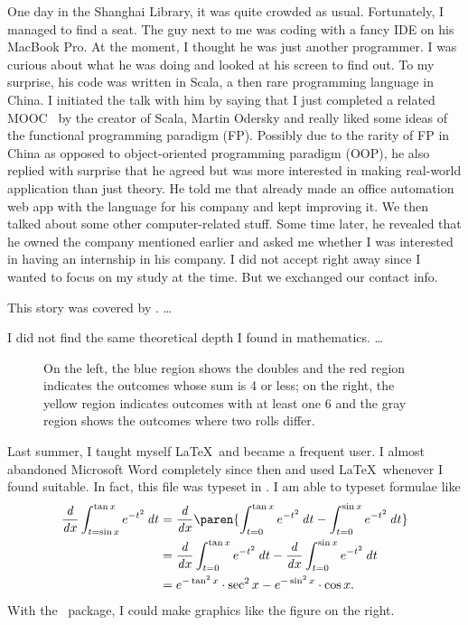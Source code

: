 	One day in the Shanghai Library, it was quite crowded as usual. Fortunately, I managed to find a seat. The guy next to me was coding with a fancy IDE on his MacBook Pro. At the moment, I thought he was just another programmer. I was curious about what he was doing and looked at his screen to find out. To my surprise, his code was written in Scala, a then rare programming language in China. I initiated the talk with him by saying that I just completed a related MOOC~\cite{FPPS} by the creator of Scala, Martin Odersky and really liked some ideas of the functional programming paradigm (FP). Possibly due to the rarity of FP in China as opposed to object-oriented programming paradigm (OOP), he also replied with surprise that he agreed but was more interested in making real-world application than just theory. He told me that already made an office automation web app with the language for his company and kept improving it. We then talked about some other computer-related stuff. Some time later, he revealed that he owned the company mentioned earlier and asked me whether I was interested in having an internship in his company. I did not accept right away since I wanted to focus on my study at the time. But we exchanged our contact info.
	
	This story was covered by . \dots %
	
	I did not find the same theoretical depth I found in mathematics.
	\dots
	
	\begin{wrapfigure}[8]{r}[.6in]{.4\textwidth}
		\scalebox{.4}{  }
		\caption{On the left, the blue region shows the doubles and the red region indicates the outcomes whose sum is 4 or less; on the right, the yellow region indicates outcomes with at least one 6 and the gray region shows the outcomes where two rolls differ.}
		\label{fig:CondProbEx}
	\end{wrapfigure}
	
	Last summer, I taught myself \LaTeX\ and became a frequent user. I almost abandoned Microsoft Word completely since then and used \LaTeX\ whenever I found suitable. In fact, this file was typeset in \XeLaTeX. I am able to typeset formulae like
	\begin{align*}
	\dd x \int_{t=\sin x}^{\tan x} e^{-t^2} \dt
		&= \dd x \paren{\int_{t=0}^{\tan x} e^{-t^2} \dt -
			\int_{t=0}^{\sin x} e^{-t^2} \dt} \\
		&= \dd x \int_{t=0}^{\tan x} e^{-t^2} \dt
			- \dd x \int_{t=0}^{\sin x} e^{-t^2} \dt \\
		&= e^{-\tan^2 x} \cdot \sec^2 x - e^{-\sin^2 x} \cdot \cos x.
	\end{align*}
	With the \TikZ\ package, I could make graphics like the figure on the right.
	
